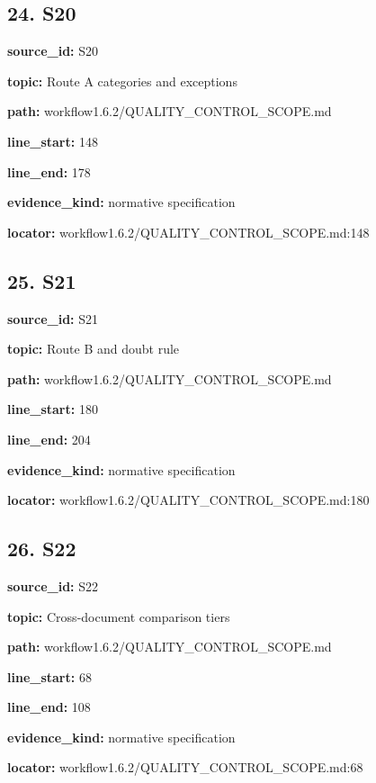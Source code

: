 \documentclass[10pt,a4paper]{article}
\begin{document}
\subsection*{24.\allowbreak{} S20}
\textbf{source\_\allowbreak{}id:} S20\par
\textbf{topic:} Route A categories and exceptions\par
\textbf{path:} workflow1.\allowbreak{}6.\allowbreak{}2/\allowbreak{}QUALITY\_\allowbreak{}CONTROL\_\allowbreak{}SCOPE.\allowbreak{}md\par
\textbf{line\_\allowbreak{}start:} 148\par
\textbf{line\_\allowbreak{}end:} 178\par
\textbf{evidence\_\allowbreak{}kind:} normative specification\par
\textbf{locator:} workflow1.\allowbreak{}6.\allowbreak{}2/\allowbreak{}QUALITY\_\allowbreak{}CONTROL\_\allowbreak{}SCOPE.\allowbreak{}md:148\par
\subsection*{25.\allowbreak{} S21}
\textbf{source\_\allowbreak{}id:} S21\par
\textbf{topic:} Route B and doubt rule\par
\textbf{path:} workflow1.\allowbreak{}6.\allowbreak{}2/\allowbreak{}QUALITY\_\allowbreak{}CONTROL\_\allowbreak{}SCOPE.\allowbreak{}md\par
\textbf{line\_\allowbreak{}start:} 180\par
\textbf{line\_\allowbreak{}end:} 204\par
\textbf{evidence\_\allowbreak{}kind:} normative specification\par
\textbf{locator:} workflow1.\allowbreak{}6.\allowbreak{}2/\allowbreak{}QUALITY\_\allowbreak{}CONTROL\_\allowbreak{}SCOPE.\allowbreak{}md:180\par
\subsection*{26.\allowbreak{} S22}
\textbf{source\_\allowbreak{}id:} S22\par
\textbf{topic:} Cross-\allowbreak{}document comparison tiers\par
\textbf{path:} workflow1.\allowbreak{}6.\allowbreak{}2/\allowbreak{}QUALITY\_\allowbreak{}CONTROL\_\allowbreak{}SCOPE.\allowbreak{}md\par
\textbf{line\_\allowbreak{}start:} 68\par
\textbf{line\_\allowbreak{}end:} 108\par
\textbf{evidence\_\allowbreak{}kind:} normative specification\par
\textbf{locator:} workflow1.\allowbreak{}6.\allowbreak{}2/\allowbreak{}QUALITY\_\allowbreak{}CONTROL\_\allowbreak{}SCOPE.\allowbreak{}md:68\par
\end{document}
